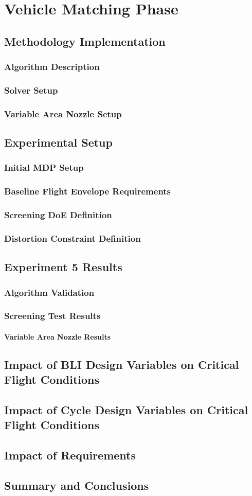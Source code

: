 \chapter{Vehicle Matching Phase}
\section{Methodology Implementation}
\subsection{Algorithm Description}
\subsection{Solver Setup}
\subsection{Variable Area Nozzle Setup}
\section{Experimental Setup}
\subsection{Initial MDP Setup}
\subsection{Baseline Flight Envelope Requirements}
\subsection{Screening DoE Definition}
\subsection{Distortion Constraint Definition}
\section{Experiment 5 Results}
\subsection{Algorithm Validation}
\subsection{Screening Test Results}
\subsubsection{Variable Area Nozzle Results}
\section{Impact of BLI Design Variables on Critical Flight Conditions}
\section{Impact of Cycle Design Variables on Critical Flight Conditions}
\section{Impact of Requirements}
\section{Summary and Conclusions}

